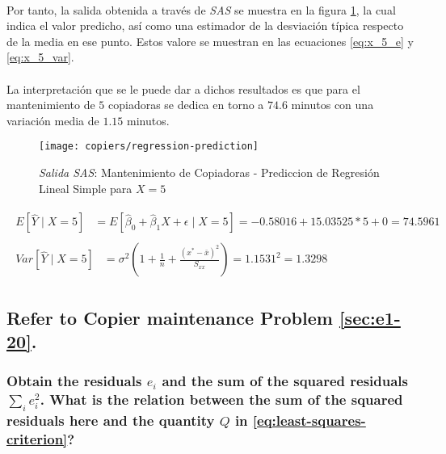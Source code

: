 \documentclass{article}
\begin{document}
        \paragraph{}
        Por tanto, la salida obtenida a través de \emph{SAS} se muestra en la figura \ref{img:copiers-regression-prediction}, la cual indica el valor predicho, así como una estimador de la desviación típica respecto de la media en ese punto. Estos valore se muestran en las ecuaciones \eqref{eq:x_5_e} y \eqref{eq:x_5_var}.

        \paragraph{}
        La interpretación que se le puede dar a dichos resultados es que para el mantenimiento de $5$ copiadoras se dedica en torno a $74.6$ minutos con una variación media de $1.15$ minutos.

        \begin{figure}[!h]
          \centering
          \texttt{[image: copiers/regression-prediction]}
          \caption{\emph{Salida SAS}: Mantenimiento de Copiadoras - Prediccion de Regresión Lineal Simple para $X = 5$}
          \label{img:copiers-regression-prediction}
        \end{figure}

        \begin{align}
        \label{eq:x_5_e}
          \begin{split}
            E\left[\widehat{Y} \mid X = 5\right] &=
            E\left[\widehat{\beta}_0 +\widehat{\beta}_1X + \epsilon \mid X = 5\right]
            = -0.58016 + 15.03525 * 5 + 0 = 74.5961
          \end{split}\\
        \label{eq:x_5_var}
          \begin{split}
            Var\left[\widehat{Y} \mid X = 5\right] &=
            \sigma^2\left(1 + \frac{1}{n} + \frac{(x^* - \bar{x})^2}{S_{xx}}\right) =
            1.1531 ^ 2 =
            1.3298
          \end{split}
        \end{align}

    \setcounter{subsection}{23}
    \subsection{Refer to \textbf{Copier maintenance} Problem \ref{sec:e1-20}.}

      \subsubsection{Obtain the residuals $e_i$ and the sum of the squared residuals $\sum_i e_i^2$. What is the relation between the sum of the squared residuals here and the quantity $Q$ in \eqref{eq:least-squares-criterion}?}
\end{document}
